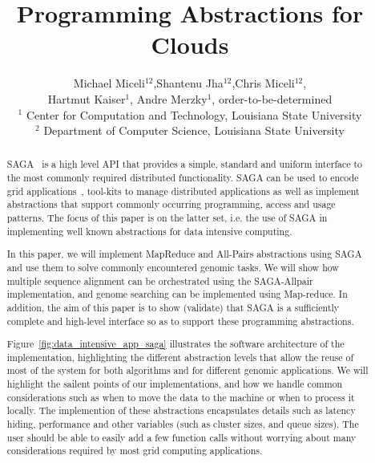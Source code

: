 \documentclass{article}
\begin{document}
\title{\large Programming Abstractions for Clouds}

\author{Michael Miceli$^{12}$,Shantenu Jha$^{12}$,Chris
  Miceli$^{12}$, \\  Hartmut Kaiser$^{1}$, Andre
  Merzky$^{1}$, order-to-be-determined \\[1em]
        $^1$ \small
          Center for Computation and Technology, 
          Louisiana State University\\[-0.3em]
        $^2$ \small
          Department of Computer Science, 
          Louisiana State University\\[-0.3em]
        }
\maketitle

\begin{abstract}

  \noindent
SAGA~\cite{saga_gfd90} is a high level API that provides a simple,
standard and uniform interface to the most commonly required
distributed functionality.  SAGA can be used to encode grid
applications~\cite{saga_escience07, saga_tg08}, tool-kits to manage
distributed applications as well as implement abstractions that
support commonly occurring programming, access and usage patterns.
The focus of this paper is on the latter set, i.e.  the use of SAGA in
implementing well known abstractions for data intensive computing.

In this paper, we will implement MapReduce and All-Pairs abstractions
using SAGA and use them to solve commonly encountered genomic tasks.
We will show how multiple sequence alignment can be orchestrated using
the SAGA-Allpair implementation, and genome searching can be
implemented using Map-reduce.  In addition, the aim of this paper is
to show (validate) that SAGA is a sufficiently complete and high-level
interface so as to support these programming abstractions.

Figure~\ref{fig:data_intensive_app_saga} illustrates the software
architecture of the implementation, highlighting the different
abstraction levels that allow the reuse of most of the system for both
algorithms and for different genomic applications.  We will highlight
the sailent points of our implementations, and how we handle common
considerations such as when to move the data to the machine or when to
process it locally.  The implemention of these abstractions
encapsulates details such as latency hiding, performance and other
variables (such as cluster sizes, and queue sizes).  The user should
be able to easily add a few function calls without worrying about many
considerations required by most grid computing applications.


\end{abstract}
\end{document}
